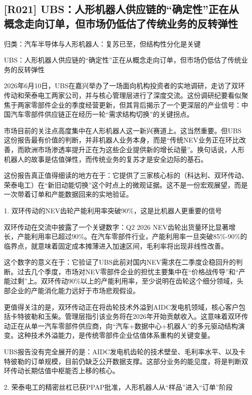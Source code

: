 \documentclass[11pt]{ctexart}
\begin{document}
\subsection{[R021] UBS：人形机器人供应链的“确定性”正在从概念走向订单，但市场仍低估了传统业务的反转弹性}
{\small\color{refgray}归类：汽车半导体与人形机器人：复苏已至，但结构性分化是关键}

UBS：人形机器人供应链的“确定性”正在从概念走向订单，但市场仍低估了传统业务的反转弹性

2026年6月10日，UBS在嘉兴举办了一场面向机构投资者的实地调研，走访了双环传动和荣泰电工两家公司，并与核心管理层进行了深度交流。这份调研纪要看似聚焦于两家零部件企业的季度经营更新，但其背后揭示了一个更深层的产业信号：中国汽车零部件供应链正在经历一轮“需求结构切换”的关键拐点。

市场目前的关注点高度集中在人形机器人这一新兴赛道上。这当然重要。但UBS这份报告最有价值的判断，并非机器人业务本身，而是“传统NEV业务正在环比改善，而欧洲市场渗透率提升正在为这些企业提供新的增长动量”。换句话说，人形机器人的故事是估值弹性，而传统业务的复苏才是安全边际的基石。

这份报告真正值得细读的地方在于：它提供了三家核心标的（科达利、双环传动、荣泰电工）在“新旧动能切换”这个时点上的微观证据。这不是一份宏观展望，而是一次带着订单和产能数据回来的实地验证。

1. 双环传动的NEV齿轮产能利用率突破90\%，这是比机器人更重要的信号

双环传动在交流中披露了一个关键数字：Q2 2026 NEV齿轮出货量环比显著增长，产能利用率已超过90\%。在汽车零部件行业，产能利用率一旦突破85\%-90\%的临界点，就意味着固定成本摊薄进入加速区间，毛利率将出现非线性改善。

这个数字的意义在于：它验证了UBS此前对国内NEV需求在二季度企稳回升的判断。过去几个季度，市场对NEV零部件企业的担忧主要集中在“价格战传导”和“产能过剩”上。双环传动90\%以上的产能利用率，至少说明在齿轮这个细分领域，头部企业的产能消化能力远好于市场悲观假设。

更值得关注的是，双环传动正在将齿轮技术外溢到AIDC发电机领域，核心客户包括卡特彼勒和玉柴。管理层指引该业务将在2026年开始贡献收入。这意味着双环传动正在从单一汽车零部件供应商，向“汽车+数据中心+机器人”的多元驱动结构演变。这种技术外溢能力，是传统零部件企业估值体系重构的关键变量。

UBS报告没有完全展开的是：AIDC发电机齿轮的技术壁垒、毛利率水平、以及卡特彼勒的订单规模，目前仍缺乏公开数据支撑。这部分业务的能见度，将是判断双环传动长期估值中枢能否上移的核心。

2. 荣泰电工的精密丝杠已获PPAP批准，人形机器人从“样品”进入“订单”阶段
\end{document}
